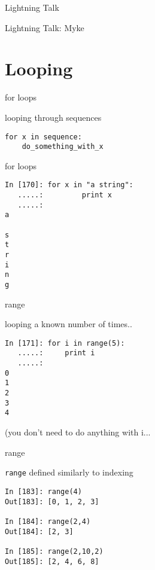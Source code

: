 \documentclass{beamer}
\begin{document}
\begin{frame}{Lightning Talk}

{\LARGE Lightning Talk: Myke }

\end{frame}

\section{Looping}

\begin{frame}[fragile]{for loops}

{\Large looping through sequences

\begin{verbatim}
for x in sequence:
    do_something_with_x
\end{verbatim}
}
\end{frame}

\begin{frame}[fragile]{for loops}

\begin{verbatim}
In [170]: for x in "a string":
   .....:         print x
   .....:     
a
 
s
t
r
i
n
g
\end{verbatim}
\end{frame}

\begin{frame}[fragile]{range}

{\Large looping a known number of times..}

\begin{verbatim}
In [171]: for i in range(5):
   .....:     print i
   .....:     
0
1
2
3
4
\end{verbatim}
(you don't need to do anything with i...
\end{frame}

\begin{frame}[fragile]{range}

{\Large \verb|range| defined similarly to indexing}

\begin{verbatim}
In [183]: range(4)
Out[183]: [0, 1, 2, 3]

In [184]: range(2,4)
Out[184]: [2, 3]

In [185]: range(2,10,2)
Out[185]: [2, 4, 6, 8]
\end{verbatim}

\end{frame}
\end{document}
